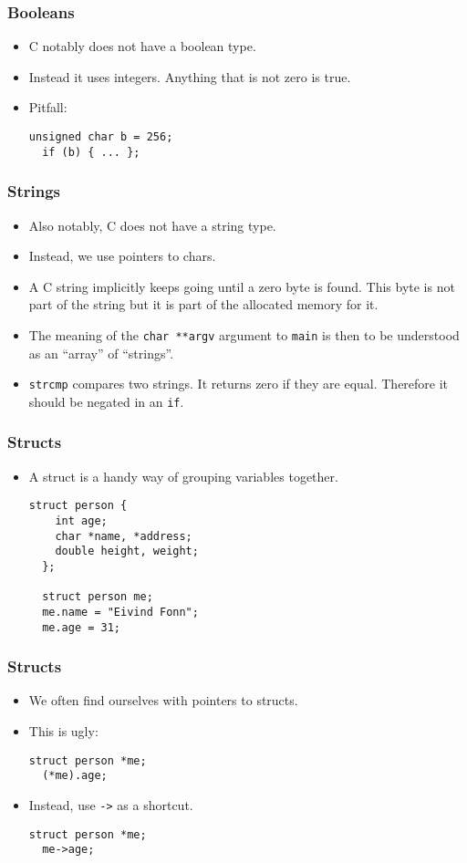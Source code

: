 \begin{frame}[fragile]
  \frametitle{Booleans}
  \begin{itemize}
  \item C notably does not have a boolean type.
  \item Instead it uses integers. Anything that is not zero is true.
  \item Pitfall:
\begin{lstlisting}[style=c]
  unsigned char b = 256;
  if (b) { ... };
\end{lstlisting}
  \end{itemize}
\end{frame}

\begin{frame}[fragile]
  \frametitle{Strings}
  \begin{itemize}
  \item Also notably, C does not have a string type.
  \item Instead, we use pointers to chars.
  \item A C string implicitly keeps going until a zero byte is found. This byte
    is not part of the string but it is part of the allocated memory for it.
  \item The meaning of the \texttt{char **argv} argument to \texttt{main} is
    then to be understood as an ``array'' of ``strings''.
  \item \texttt{strcmp} compares two strings. It returns zero if they are equal.
    Therefore it should be negated in an \texttt{if}.
  \end{itemize}
\end{frame}

\begin{frame}[fragile]
  \frametitle{Structs}
  \begin{itemize}
  \item A struct is a handy way of grouping variables together.
\begin{lstlisting}[style=c]
  struct person {
    int age;
    char *name, *address;
    double height, weight;
  };

  struct person me;
  me.name = "Eivind Fonn";
  me.age = 31;
\end{lstlisting}
  \end{itemize}
\end{frame}

\begin{frame}[fragile]
  \frametitle{Structs}
  \begin{itemize}
  \item We often find ourselves with pointers to structs.
  \item This is ugly:
\begin{lstlisting}[style=c]
  struct person *me;
  (*me).age;
\end{lstlisting}
  \item Instead, use \texttt{->} as a shortcut.
\begin{lstlisting}[style=c]
  struct person *me;
  me->age;
\end{lstlisting}
  \end{itemize}
\end{frame}

